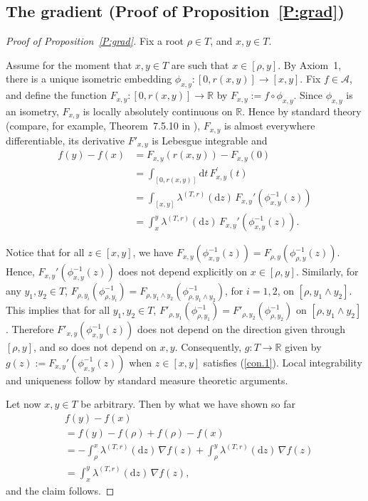 \documentclass[11pt]{amsart}
\numberwithin{equation}{section}
\begin{document}
{\subsection{The gradient (Proof of Proposition~\ref{P:grad})}
\label{Sub:proof21}
\begin{proof}[Proof of Proposition~\ref{P:grad}]
Fix a root $\rho\in T$, and $x,y\in T$.

Assume for the moment that $x,y\in T$ are such that $x\in[\rho,y]$.  By Axiom~1, there is a unique isometric embedding $\phi_{x,y}:[0,r(x,y)]\to[x,y]$.  Fix $f\in{\mathcal A}$, and define the function $F_{x,y}:[0,r(x,y)]\to{{\mathbb R}}$ by
$F_{x,y}:=f\circ\phi_{x,y}$. Since $\phi_{x,y}$ is an isometry, $F_{x,y}$ is locally absolutely continuous on ${{\mathbb R}}$.
Hence by standard theory (compare, for example, Theorem~7.5.10 in \cite{AthSun09}),
$F_{x,y}$ is  almost everywhere differentiable,
its derivative $F'_{x,y}$ is Lebesgue integrable and
\begin{equation}\label{grund}
\begin{aligned}
  f(y)-f(x)
 &=
  F_{x,y}(r(x,y))-F_{x,y}(0)
  \\
 &=
  \int_{[0,r(x,y)]}\mathrm{d}t\,F_{x,y}^\prime(t)
  \\
 &=
   \int_{[x,y]}\lambda^{(T,r)}(\mathrm{d}z)\,F_{x,y}'(\phi^{-1}_{x,y}(z))
  \\
 &=
  \int_x^y\lambda^{(T,r)}(\mathrm{d}z)\,F_{x,y}'(\phi^{-1}_{x,y}(z)).
\end{aligned}
\end{equation}

Notice that for all $z\in [x,y]$, we have $F_{x,y}(\phi^{-1}_{x,y}(z))=F_{\rho,y}(\phi^{-1}_{\rho,y}(z))$. Hence, $F_{x,y}'(\phi^{-1}_{x,y}(z))$ does not depend explicitly on $x\in[\rho,y]$. Similarly, for any $y_{1},y_{2}\in T$, $F_{\rho,y_i}(\phi^{-1}_{\rho,y_i})=F_{\rho,y_1\wedge y_2}(\phi^{-1}_{\rho,y_1\wedge y_2})$, for $i=1,2$, on $[\rho,y_1\wedge y_2]$. This implies that for all $y_1,y_2\in T$, $F'_{\rho,y_1}(\phi^{-1}_{\rho,y_1})=F'_{\rho,y_2}(\phi^{-1}_{\rho,y_2})$ on $[\rho,y_1\wedge y_2]$.  Therefore  $F'_{x,y}(\phi^{-1}_{x,y}(z))$  does not depend on the direction given through $[\rho,y]$, and so does not depend on $x,y$.
Consequently, $g:T\rightarrow {{\mathbb R}}$ given by $g(z):= F_{x,y}'(\phi^{-1}_{x,y}(z))$ when $z \in [x,y]$ satisfies (\ref{con.1}). Local integrability and uniqueness follow by standard measure theoretic arguments. {\smallskip}

Let now $x,y\in T$ be arbitrary. Then by what we have shown so far
\begin{equation}\label{grund2}
\begin{aligned}
   &f(y)-f(x)
  \\
 &=
   f(y)-f(\rho)+f(\rho)-f(x)
 \\
 &=
   -{\int_{\rho}^x}\lambda^{(T,r)}(\mathrm{d}z)\,\nabla f(z)+{\int_\rho^y}\lambda^{(T,r)}(\mathrm{d}z)\,\nabla f(z)
  \\
 &=
   \int_x^y\lambda^{(T,r)}(\mathrm{d}z)\,\nabla f(z),
\end{aligned}
\end{equation}
and the claim follows.
\end{proof}{\smallskip}

}
\end{document}
